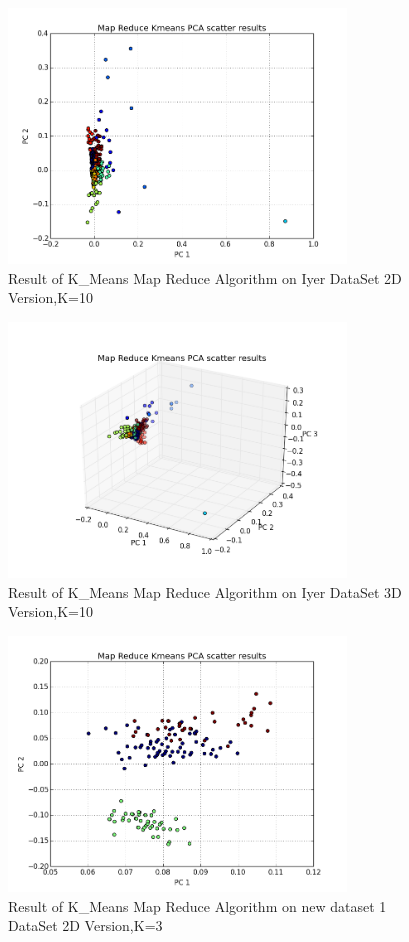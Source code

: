 \documentclass[paper=letter, fontsize=11pt]{article}
\numberwithin{equation}{section}		%
\numberwithin{figure}{section}			%
\numberwithin{table}{section}				%
\begin{document}
\begin{figure}[H]
	\centering
	\includegraphics[width=0.8\textwidth]{MP_iyer_2D}
	\caption{Result of K\_Means Map Reduce Algorithm on Iyer DataSet 2D Version,K=10}
\end{figure}
\begin{figure}[H]
	\centering
	\includegraphics[width=0.8\textwidth]{MP_iyer_3D}
	\caption{Result of K\_Means Map Reduce Algorithm on Iyer DataSet 3D Version,K=10}
\end{figure}
\begin{figure}[H]
	\centering
	\includegraphics[width=0.8\textwidth]{MP_new_dataset_1_2D}
	\caption{Result of K\_Means Map Reduce Algorithm on new dataset 1 DataSet 2D Version,K=3}
\end{figure}
\end{document}
